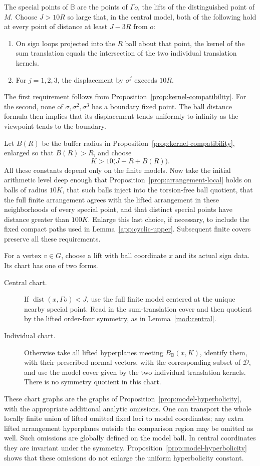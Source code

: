 \documentclass[11pt,reqno]{amsart}
\numberwithin{equation}{section}
\theoremstyle{definition}
\theoremstyle{remark}
\newcommand{\BB}{\mathbb B}
\newcommand{\cD}{\mathcal D}
\DeclareMathOperator{\dist}{dist}
\begin{document}
The special points of $\BB$ are the points of $\Gamma o$, the lifts
of the distinguished point of $M$.  Choose $J>10R$ so large that, in
the central model, both of the following hold at every point of
distance at least $J-3R$ from $o$:
\begin{enumerate}
\item On sign loops projected into the $R$ ball about that point, the
kernel of the sum translation equals the intersection of the two
individual translation kernels.
\item For $j=1,2,3$, the displacement by $\sigma^j$ exceeds $10R$.
\end{enumerate}
The first requirement follows from
Proposition~\ref{prop:kernel-compatibility}.  For the second, none of
$\sigma,\sigma^2,\sigma^3$ has a boundary fixed point.  The ball
distance formula then implies that its displacement tends uniformly
to infinity as the viewpoint tends to the boundary.

Let $B(R)$ be the buffer radius in
Proposition~\ref{prop:kernel-compatibility}, enlarged so that
$B(R)>R$, and choose
\begin{equation}\label{app:chart-radius}
 K>10\bigl(J+R+B(R)\bigr).
\end{equation}
All these constants depend only on the finite models.  Now take the
initial arithmetic level deep enough that
Proposition~\ref{prop:arrangement-local} holds on balls of radius
$10K$, that such balls inject into the torsion-free ball quotient,
that the full finite arrangement agrees with the lifted arrangement
in these neighborhoods of every special point, and that distinct
special points have distance greater than $100K$.  Enlarge this last
choice, if necessary, to include the fixed compact paths used in
Lemma~\ref{app:cyclic-upper}.  Subsequent finite covers preserve all
these requirements.

For a vertex $v\in G$, choose a lift with ball coordinate $x$ and its
actual sign data.  Its chart has one of two forms.
\begin{description}
\item[Central chart.] If $\dist(x,\Gamma o)<J$, use the full finite
model centered at the unique nearby special point.  Read in the
sum-translation cover and then quotient by the lifted order-four
symmetry, as in Lemma~\ref{mod:central}.
\item[Individual chart.] Otherwise take all lifted hyperplanes
meeting $B_{\BB}(x,K)$, identify them, with their prescribed normal
vectors, with the corresponding subset of $\cD$, and use the model
cover given by the two individual translation kernels.  There is no
symmetry quotient in this chart.
\end{description}
These chart graphs are the graphs of
Proposition~\ref{prop:model-hyperbolicity}, with the appropriate
additional analytic omissions.  One can transport the whole locally
finite union of lifted omitted fixed loci to model coordinates; any
extra lifted arrangement hyperplanes outside the comparison region
may be omitted as well.  Such omissions are globally defined on the
model ball.  In central coordinates they are invariant under the
symmetry.  Proposition~\ref{prop:model-hyperbolicity} shows that these
omissions do not enlarge the uniform hyperbolicity constant.
\end{document}
